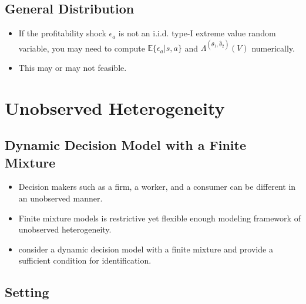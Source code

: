 \documentclass[]{book}
\providecommand{\tightlist}{%
  \setlength{\itemsep}{0pt}\setlength{\parskip}{0pt}}
\begin{document}
\subsection{General Distribution}\label{general-distribution}

\begin{itemize}
\tightlist
\item
  If the profitability shock \(\epsilon_a\) is not an i.i.d. type-I
  extreme value random variable, you may need to compute
  \(\mathbb{E}\{\epsilon_a|s, a\}\) and
  \(\Lambda^{(\theta_1, \hat{\theta}_2)}(V)\) numerically.
\item
  This may or may not feasible.
\end{itemize}

\section{Unobserved Heterogeneity}\label{unobserved-heterogeneity}

\subsection{Dynamic Decision Model with a Finite
Mixture}\label{dynamic-decision-model-with-a-finite-mixture}

\begin{itemize}
\tightlist
\item
  Decision makers such as a firm, a worker, and a consumer can be
  different in an unobserved manner.
\item
  Finite mixture models is restrictive yet flexible enough modeling
  framework of unobserved heterogeneity.
\item
  \citet{kasaharaNonparametricIdentificationFinite2009} consider a
  dynamic decision model with a finite mixture and provide a sufficient
  condition for identification.
\end{itemize}

\subsection{Setting}\label{setting-1}
\end{document}
